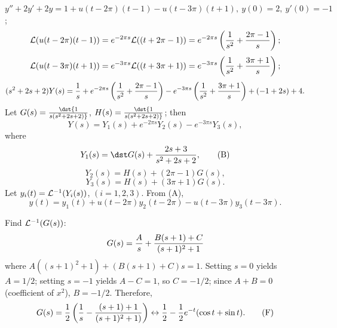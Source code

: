 \documentclass[dvips]{book}
\renewcommand{\exer}[1]{\par\medskip\;\noindent{\color{red}\bf #1.}}
\numberwithin{example}{section}
\numberwithin{equation}{section}
\numberwithin{theorem}{section}
\numberwithin{table}{section}
\numberwithin{figure}{section}
\begin{document}
\exer{8.5.20}
$y''+2y'+2y=1+u(t-2\pi)(t-1)-u(t-3\pi)(t+1),\ y(0)=2,\ y'(0)=-1$;
$$
{\cal L}(u(t-2\pi)(t-1))=e^{-2\pi s}{\cal L}((t+2\pi-1))
=e^{-2\pi s}\left({1\over s^2}+{2\pi-1\over s}\right);
$$
$$
{\cal L}(u(t-3\pi)(t+1))=e^{-3\pi s}{\cal L}((t+3\pi+1))
=e^{-3\pi s}\left({1\over s^2}+{3\pi+1\over s}\right);
$$
$$
(s^2+2s+2)Y(s)={1\over s}+
e^{-2\pi s}\left({1\over s^2}+{2\pi-1\over s}\right)
-e^{-3\pi s}\left({1\over s^2}+{3\pi+1\over s}\right)+(-1+2s)+4.
$$
Let $G(s)=\dst{1\over s(s^2+2s+2)}$,
 $H(s)=\dst{1\over s(s^2+2s+2)}$; then
\begin{equation}
Y(s)=Y_1(s)+e^{-2\pi s}Y_2(s)-e^{-3\pi s}Y_3(s),\tag{A}
\end{equation}
where
\begin{equation}
Y_1(s)=\dst G(s)+{2s+3\over s^2+2s+2},\tag{B}
\end{equation}
\begin{equation}
Y_2(s)=H(s)+(2\pi-1)G(s),\tag{C}
\end{equation}
\begin{equation}
Y_3(s)=H(s)+(3\pi+1)G(s). \tag{D}
\end{equation}
Let $y_i(t)={\cal L}^{-1}(Y_i(s))$, $(i=1,2,3)$. From (A),
\begin{equation}
y(t)=y_1(t)+u(t-2\pi)y_2(t-2\pi)-u(t-3\pi)y_3(t-3\pi).\tag{E}
\end{equation}

Find ${\cal L}^{-1}(G(s))$:
$$
G(s)={A\over s}+{B(s+1)+C\over(s+1)^2+1}
$$
where
$A((s+1)^2+1)+(B(s+1)+C)s=1$. Setting $s=0$ yields $A=1/2$;
setting $s=-1$ yields $A-C=1$, so $C=-1/2$; since $A+B=0$
(coefficient of $x^2$), $B=-1/2$. Therefore,
\begin{equation}
G(s)={1\over2}\left({1\over s}-{(s+1)+1\over(s+1)^2+1)}\right)
\leftrightarrow {1\over2}-{1\over2}e^{-t}(\cos t+\sin t).
\tag{F}
\end{equation}
\end{document}
